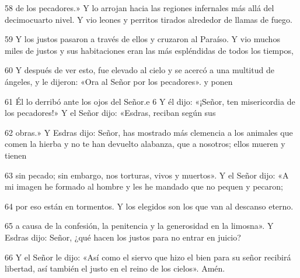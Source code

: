 \par 58 de los pecadores.» Y lo arrojan hacia las regiones infernales más allá del decimocuarto nivel. Y vio leones y perritos tirados alrededor de llamas de fuego.

\par 59 Y los justos pasaron a través de ellos y cruzaron al Paraíso. Y vio muchos miles de justos y sus habitaciones eran las más espléndidas de todos los tiempos,

\par 60 Y después de ver esto, fue elevado al cielo y se acercó a una multitud de ángeles, y le dijeron: «Ora al Señor por los pecadores». y ponen

\par 61 Él lo derribó ante los ojos del Señor.e 6 Y él dijo: «¡Señor, ten misericordia de los pecadores!» Y el Señor dijo: «Esdras, reciban según sus

\par 62 obras.» Y Esdras dijo: Señor, has mostrado más clemencia a los animales que comen la hierba y no te han devuelto alabanza, que a nosotros; ellos mueren y tienen

\par 63 sin pecado; sin embargo, nos torturas, vivos y muertos». Y el Señor dijo: «A mi imagen he formado al hombre y les he mandado que no pequen y pecaron;

\par 64 por eso están en tormentos. Y los elegidos son los que van al descanso eterno.

\par 65 a causa de la confesión, la penitencia y la generosidad en la limosna». Y Esdras dijo: Señor, ¿qué hacen los justos para no entrar en juicio?

\par 66 Y el Señor le dijo: «Así como el siervo que hizo el bien para su señor recibirá libertad, así también el justo en el reino de los cielos». Amén.

